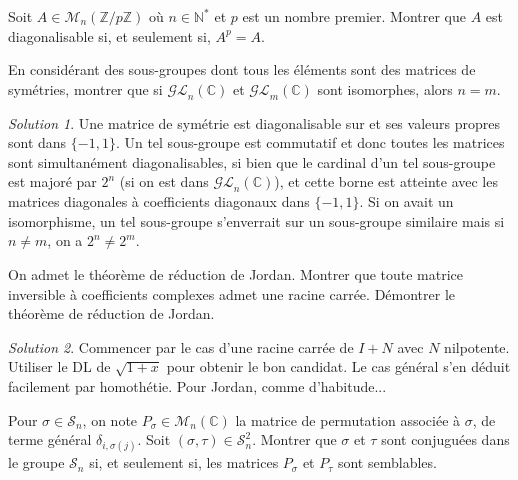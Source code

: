 \documentclass[french]{book}
\newcommand{\N}{\mathbb{N}}
\newcommand{\Z}{\mathbb{Z}}
\newcommand{\C}{\mathbb{C}}
\newcommand{\st}{^*}
\theoremstyle{definition}
\theoremstyle{remark}
\newtheorem*{sol}{Solution}
\begin{document}
\begin{exo}[1]{}
	Soit $A\in\mathcal{M}_n(\Z/p\Z)$ où $n\in\N\st$ et $p$ est un nombre premier. Montrer que $A$ est diagonalisable si, et seulement si, $A^p=A$.
\end{exo}

\begin{exo}[2]{}
	En considérant des sous-groupes dont tous les éléments sont des matrices de symétries, montrer que si $\mathcal{GL}_n(\C)$ et $\mathcal{GL}_m(\C)$ sont isomorphes, alors $n=m$.
\end{exo}
\begin{sol}
	Une matrice de symétrie est diagonalisable sur et ses valeurs propres sont dans $\{-1,1\}$. Un tel sous-groupe est commutatif et donc toutes les matrices sont simultanément diagonalisables, si bien que le cardinal d'un tel sous-groupe est majoré par $2^n$ (si on est dans $\mathcal{GL}_n(\C)$), et cette borne est atteinte avec les matrices diagonales à coefficients diagonaux dans $\{-1,1\}$. Si on avait un isomorphisme, un tel sous-groupe s'enverrait sur un sous-groupe similaire mais si $n\ne m$, on a $2^n\ne 2^m$.
\end{sol}

\begin{exo}[2]{}
	On admet le théorème de réduction de Jordan. Montrer que toute matrice inversible à coefficients complexes admet une racine carrée. Démontrer le théorème de réduction de Jordan.
\end{exo}
\begin{sol}
	Commencer par le cas d'une racine carrée de $I+N$ avec $N$ nilpotente. Utiliser le DL de $\sqrt{1+x}$ pour obtenir le bon candidat. Le cas général s'en déduit facilement par homothétie. Pour Jordan, comme d'habitude...
\end{sol}

\begin{exo}[3]{}
	Pour $\sigma\in\mathcal{S}_n$, on note $P_\sigma\in\mathcal{M}_n(\C)$ la matrice de permutation associée à $\sigma$, de terme général $\delta_{i,\sigma(j)}$. Soit $(\sigma,\tau)\in\mathcal{S}_n^2$. Montrer que $\sigma$ et $\tau$ sont conjuguées dans le groupe $\mathcal{S}_n$ si, et seulement si, les matrices $P_\sigma$ et $P_\tau$ sont semblables.
\end{exo}
\end{document}
